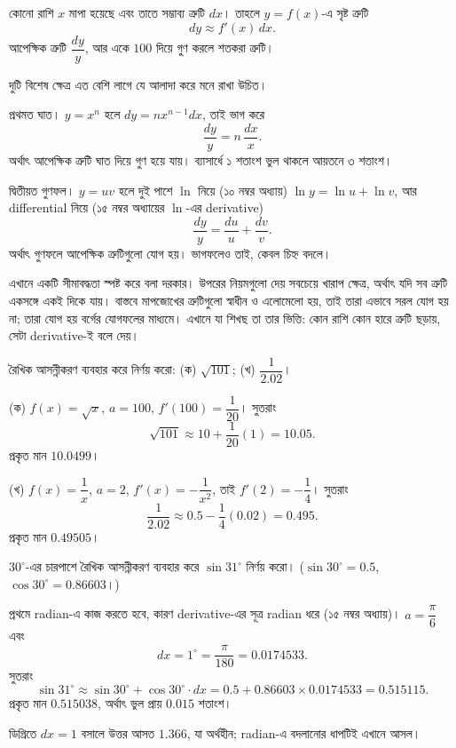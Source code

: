 \documentclass[11pt]{article}
\begin{document}
\begin{idea}[ত্রুটি নির্ণয়]
কোনো রাশি $x$ মাপা হয়েছে এবং তাতে সম্ভাব্য ত্রুটি $dx$। তাহলে $y = f(x)$-এ
সৃষ্ট ত্রুটি
\[
  dy \approx f'(x)\,dx .
\]
আপেক্ষিক ত্রুটি $\dfrac{dy}{y}$, আর একে $100$ দিয়ে গুণ করলে শতকরা ত্রুটি।
\end{idea}

দুটি বিশেষ ক্ষেত্র এত বেশি লাগে যে আলাদা করে মনে রাখা উচিত।

প্রথমত ঘাত। $y = x^{n}$ হলে $dy = nx^{n-1}dx$, তাই ভাগ করে
\[
  \frac{dy}{y} = n\,\frac{dx}{x} .
\]
অর্থাৎ আপেক্ষিক ত্রুটি ঘাত দিয়ে গুণ হয়ে যায়। ব্যাসার্ধে ১ শতাংশ ভুল থাকলে
আয়তনে ৩ শতাংশ।

দ্বিতীয়ত গুণফল। $y = uv$ হলে দুই পাশে $\ln$ নিয়ে (১০ নম্বর অধ্যায়)
$\ln y = \ln u + \ln v$, আর differential নিয়ে (১৫ নম্বর অধ্যায়ের
$\ln$-এর derivative)
\[
  \frac{dy}{y} = \frac{du}{u} + \frac{dv}{v} .
\]
অর্থাৎ গুণফলে আপেক্ষিক ত্রুটিগুলো যোগ হয়। ভাগফলেও তাই, কেবল চিহ্ন বদলে।

\begin{remark}
এখানে একটি সীমাবদ্ধতা স্পষ্ট করে বলা দরকার। উপরের নিয়মগুলো দেয় সবচেয়ে
খারাপ ক্ষেত্র, অর্থাৎ যদি সব ত্রুটি একসঙ্গে একই দিকে যায়। বাস্তবে মাপজোখের
ত্রুটিগুলো স্বাধীন ও এলোমেলো হয়, তাই তারা এভাবে সরল যোগ হয় না; তারা যোগ হয়
বর্গের যোগফলের মাধ্যমে। এখানে
যা শিখছ তা তার ভিত্তি: কোন রাশি কোন হারে ত্রুটি ছড়ায়, সেটা derivative-ই বলে
দেয়।
\end{remark}

 রৈখিক আসন্নীকরণ ব্যবহার করে নির্ণয় করো: (ক) $\sqrt{101}$;
(খ) $\dfrac{1}{2.02}$।

\begin{sol}
(ক) $f(x) = \sqrt{x}$, $a = 100$, $f'(100) = \dfrac{1}{20}$। সুতরাং
\[
  \sqrt{101} \approx 10 + \frac{1}{20}(1) = 10.05 .
\]
প্রকৃত মান $10.0499$।

(খ) $f(x) = \dfrac{1}{x}$, $a = 2$, $f'(x) = -\dfrac{1}{x^{2}}$, তাই
$f'(2) = -\dfrac{1}{4}$। সুতরাং
\[
  \frac{1}{2.02} \approx 0.5 - \frac{1}{4}(0.02) = 0.495 .
\]
প্রকৃত মান $0.49505$।
\end{sol}

 $30^{\circ}$-এর চারপাশে রৈখিক আসন্নীকরণ ব্যবহার করে
$\sin 31^{\circ}$ নির্ণয় করো। ($\sin 30^{\circ} = 0.5$,
$\cos 30^{\circ} = 0.86603$।)

\begin{sol}
প্রথমে radian-এ কাজ করতে হবে, কারণ derivative-এর সূত্র radian ধরে
(১৫ নম্বর অধ্যায়)। $a = \dfrac{\pi}{6}$ এবং
\[
  dx = 1^{\circ} = \frac{\pi}{180} = 0.0174533 .
\]
সুতরাং
\[
  \sin 31^{\circ} \approx \sin 30^{\circ} + \cos 30^{\circ} \cdot dx
  = 0.5 + 0.86603 \times 0.0174533 = 0.515115 .
\]
প্রকৃত মান $0.515038$, অর্থাৎ ভুল প্রায় $0.015$ শতাংশ।

ডিগ্রিতে $dx = 1$ বসালে উত্তর আসত $1.366$, যা অর্থহীন; radian-এ বদলানোর
ধাপটিই এখানে আসল।
\end{sol}
\end{document}
